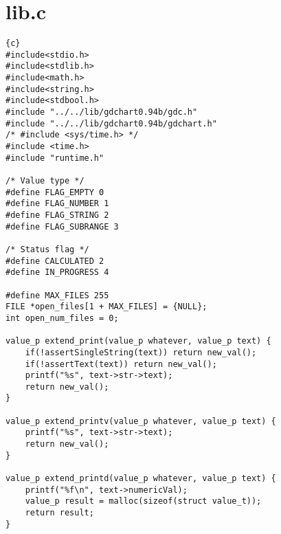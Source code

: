 \section{lib.c}
\begin{lstlisting}{c}
#include<stdio.h>
#include<stdlib.h>
#include<math.h>
#include<string.h>
#include<stdbool.h>
#include "../../lib/gdchart0.94b/gdc.h"
#include "../../lib/gdchart0.94b/gdchart.h"
/* #include <sys/time.h> */
#include <time.h>
#include "runtime.h"

/* Value type */
#define FLAG_EMPTY 0
#define FLAG_NUMBER 1
#define FLAG_STRING 2
#define FLAG_SUBRANGE 3

/* Status flag */
#define CALCULATED 2
#define IN_PROGRESS 4

#define MAX_FILES 255
FILE *open_files[1 + MAX_FILES] = {NULL};
int open_num_files = 0;

value_p extend_print(value_p whatever, value_p text) {
	if(!assertSingleString(text)) return new_val();
	if(!assertText(text)) return new_val();
	printf("%s", text->str->text);
	return new_val();
}

value_p extend_printv(value_p whatever, value_p text) {
	printf("%s", text->str->text);
	return new_val();
}

value_p extend_printd(value_p whatever, value_p text) {
	printf("%f\n", text->numericVal);
	value_p result = malloc(sizeof(struct value_t));
	return result;
}


\end{lstlisting}

